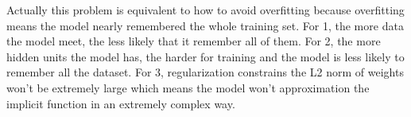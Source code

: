 \documentclass[11pt]{article}
\makeatletter
\newcommand{\boxspacing}{\kern\kvtcb@left@rule\kern\kvtcb@boxsep}
\newcommand{\prompt}[4]{
        {\ttfamily\llap{{\color{#2}[#3]:\hspace{3pt}#4}}\vspace{-\baselineskip}}
    }
\makeatother
\begin{document}
Actually this problem is equivalent to how to avoid overfitting because
overfitting means the model nearly remembered the whole training set.
For 1, the more data the model meet, the less likely that it remember
all of them. For 2, the more hidden units the model has, the harder for
training and the model is less likely to remember all the dataset. For
3, regularization constrains the L2 norm of weights won't be extremely
large which means the model won't approximation the implicit function in
an extremely complex way.

    \begin{tcolorbox}[breakable, size=fbox, boxrule=1pt, pad at break*=1mm,colback=cellbackground, colframe=cellborder]
\prompt{In}{incolor}{ }{\boxspacing}
\begin{Verbatim}[commandchars=\\\{\}]

\end{Verbatim}
\end{tcolorbox}


    
    
    
\end{document}
